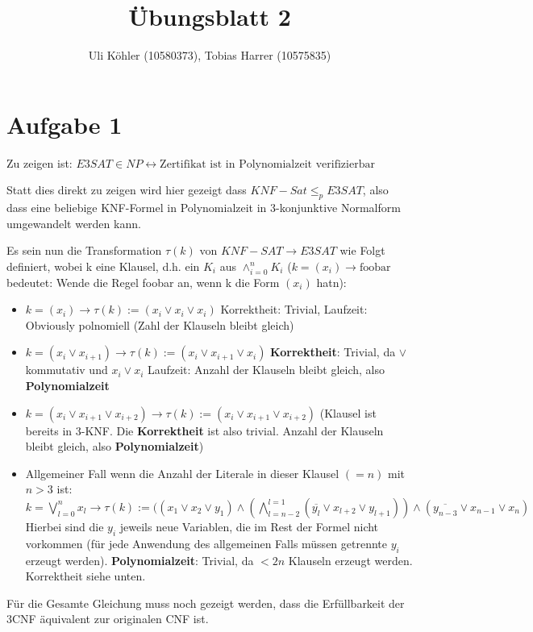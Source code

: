\documentclass[a4paper,10pt,oneside,reqno]{scrartcl}
\title{Übungsblatt 2}
\author{Uli Köhler (10580373), Tobias Harrer (10575835)}
\begin{document}
\maketitle
\section*{Aufgabe 1}%

Zu zeigen ist: $E3SAT \in {NP} \leftrightarrow \text{Zertifikat ist in Polynomialzeit verifizierbar}$

Statt dies direkt zu zeigen wird hier gezeigt dass $KNF-Sat \leq_p E3SAT$, also dass eine beliebige KNF-Formel in Polynomialzeit in 3-konjunktive Normalform umgewandelt werden kann.

Es sein nun die Transformation $\tau(k)$ von $KNF-SAT \rightarrow E3SAT$ wie Folgt definiert, wobei k eine Klausel, d.h. ein $K_i$ aus $\wedge_{i=0}^n K_i$ ($k = (x_i) \rightarrow \text{foobar}$ bedeutet: Wende die Regel foobar an, wenn k die Form $(x_i)$ hatn):
\begin{itemize}
 \item  $k = (x_i) \rightarrow \tau(k) := (x_i \vee x_i \vee x_i)$ Korrektheit: Trivial, Laufzeit: Obviously polnomiell (Zahl der Klauseln bleibt gleich)
 \item  $k = (x_i \vee x_{i+1}) \rightarrow \tau(k) :=  (x_i \vee x_{i+1} \vee x_i)$  \textbf{Korrektheit}: Trivial, da $\vee$ kommutativ und $x_i \vee x_i$ Laufzeit: Anzahl der Klauseln bleibt gleich, also \textbf{Polynomialzeit}
 \item $k = (x_i \vee x_{i+1} \vee x_{i+2}) \rightarrow \tau(k) := (x_i \vee x_{i+1} \vee x_{i+2})$ (Klausel ist bereits in 3-KNF. Die  \textbf{Korrektheit} ist also trivial. Anzahl der Klauseln bleibt gleich, also \textbf{Polynomialzeit})
 \item Allgemeiner Fall wenn die Anzahl der Literale in dieser Klausel $(=n)$ mit $n > 3$ ist: $k = \bigvee_{l=0}^{n} x_l \rightarrow \tau(k) := ( (x_1 \vee x_2 \vee y_1) \wedge (\bigwedge_{l=n-2}^{l=1} (\overline{y_l} \vee x_{l + 2} \vee y_{l+1})) \wedge (\overline{y_{n-3}} \vee x_{n-1} \vee x_{n})$ 
Hierbei sind die $y_i$ jeweils neue Variablen, die im Rest der Formel nicht vorkommen (für jede Anwendung des allgemeinen Falls müssen getrennte $y_i$ erzeugt werden). \textbf{Polynomialzeit}: Trivial, da $< 2n$ Klauseln erzeugt werden. Korrektheit siehe unten.
\end{itemize}

Für die Gesamte Gleichung muss noch gezeigt werden, dass die Erfüllbarkeit der 3CNF äquivalent zur originalen CNF ist.
\end{document}
